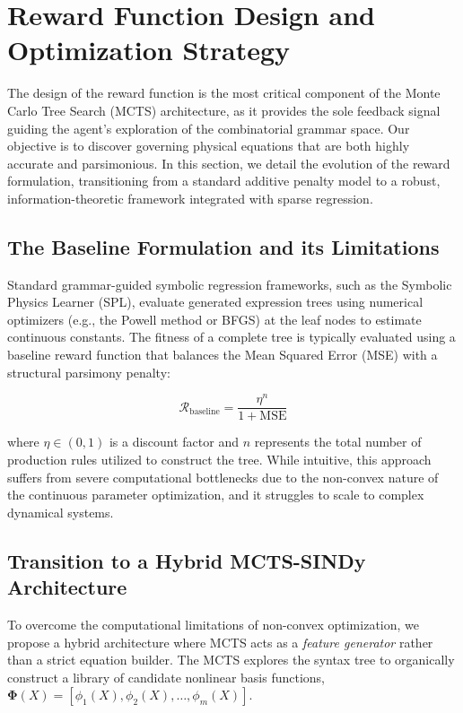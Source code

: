 \documentclass[11pt,a4paper]{article}
\begin{document}
\section{Reward Function Design and Optimization Strategy}
\label{sec:reward_design}

The design of the reward function is the most critical component of the Monte Carlo Tree Search (MCTS) architecture, as it provides the sole feedback signal guiding the agent's exploration of the combinatorial grammar space. Our objective is to discover governing physical equations that are both highly accurate and parsimonious. In this section, we detail the evolution of the reward formulation, transitioning from a standard additive penalty model to a robust, information-theoretic framework integrated with sparse regression.

\subsection{The Baseline Formulation and its Limitations}
Standard grammar-guided symbolic regression frameworks, such as the Symbolic Physics Learner (SPL), evaluate generated expression trees using numerical optimizers (e.g., the Powell method or BFGS) at the leaf nodes to estimate continuous constants. The fitness of a complete tree is typically evaluated using a baseline reward function that balances the Mean Squared Error (MSE) with a structural parsimony penalty:

\begin{equation}
    \mathcal{R}_{\text{baseline}} = \frac{\eta^n}{1 + \text{MSE}}
\end{equation}

where $\eta \in (0, 1)$ is a discount factor and $n$ represents the total number of production rules utilized to construct the tree. While intuitive, this approach suffers from severe computational bottlenecks due to the non-convex nature of the continuous parameter optimization, and it struggles to scale to complex dynamical systems.

\subsection{Transition to a Hybrid MCTS-SINDy Architecture}
To overcome the computational limitations of non-convex optimization, we propose a hybrid architecture where MCTS acts as a \textit{feature generator} rather than a strict equation builder. The MCTS explores the syntax tree to organically construct a library of candidate nonlinear basis functions, $\mathbf{\Phi}(X) = [\phi_1(X), \phi_2(X), \dots, \phi_m(X)]$. 
\end{document}
